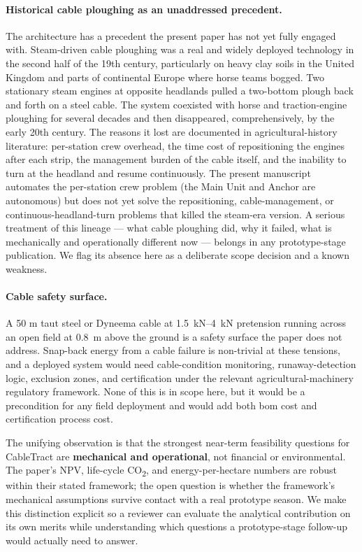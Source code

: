 \documentclass[11pt,a4paper]{article}
\begin{document}
\paragraph{Historical cable ploughing as an unaddressed precedent.} The architecture has a precedent the present paper has not yet fully engaged with. Steam-driven cable ploughing was a real and widely deployed technology in the second half of the 19th century, particularly on heavy clay soils in the United Kingdom and parts of continental Europe where horse teams bogged. Two stationary steam engines at opposite headlands pulled a two-bottom plough back and forth on a steel cable. The system coexisted with horse and traction-engine ploughing for several decades and then disappeared, comprehensively, by the early 20th century. The reasons it lost are documented in agricultural-history literature: per-station crew overhead, the time cost of repositioning the engines after each strip, the management burden of the cable itself, and the inability to turn at the headland and resume continuously. The present manuscript automates the per-station crew problem (the Main Unit and Anchor are autonomous) but does not yet solve the repositioning, cable-management, or continuous-headland-turn problems that killed the steam-era version. A serious treatment of this lineage --- what cable ploughing did, why it failed, what is mechanically and operationally different now --- belongs in any prototype-stage publication. We flag its absence here as a deliberate scope decision and a known weakness.

\paragraph{Cable safety surface.} A 50 m taut steel or Dyneema cable at \SIrange{1.5}{4}{\kilo\newton} pretension running across an open field at \SI{0.8}{\meter} above the ground is a safety surface the paper does not address. Snap-back energy from a cable failure is non-trivial at these tensions, and a deployed system would need cable-condition monitoring, runaway-detection logic, exclusion zones, and certification under the relevant agricultural-machinery regulatory framework. None of this is in scope here, but it would be a precondition for any field deployment and would add both \gls{bom} cost and certification process cost.

\medskip
The unifying observation is that the strongest near-term feasibility questions for CableTract are \textbf{mechanical and operational}, not financial or environmental. The paper's NPV, life-cycle CO\textsubscript{2}, and energy-per-hectare numbers are robust within their stated framework; the open question is whether the framework's mechanical assumptions survive contact with a real prototype season. We make this distinction explicit so a reviewer can evaluate the analytical contribution on its own merits while understanding which questions a prototype-stage follow-up would actually need to answer.
\end{document}
